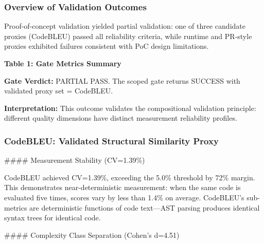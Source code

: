 
\subsubsection{Overview of Validation Outcomes}

Proof-of-concept validation yielded partial validation: one of three candidate proxies (CodeBLEU) passed all reliability criteria, while runtime and PR-style proxies exhibited failures consistent with PoC design limitations.

\textbf{Table 1: Gate Metrics Summary}

\begin{table}[htbp]
\centering
{}
\end{table}

\textbf{Gate Verdict:} PARTIAL PASS. The scoped gate returns SUCCESS with validated proxy set = {CodeBLEU}.

\textbf{Interpretation:} This outcome validates the compositional validation principle: different quality dimensions have distinct measurement reliability profiles.

\subsubsection{CodeBLEU: Validated Structural Similarity Proxy}

\#\#\#\# Measurement Stability (CV=1.39\%)

CodeBLEU achieved CV=1.39\%, exceeding the 5.0\% threshold by 72\% margin. This demonstrates near-deterministic measurement: when the same code is evaluated five times, scores vary by less than 1.4\% on average. CodeBLEU's sub-metrics are deterministic functions of code text---AST parsing produces identical syntax trees for identical code.

\#\#\#\# Complexity Class Separation (Cohen's d=4.51)

